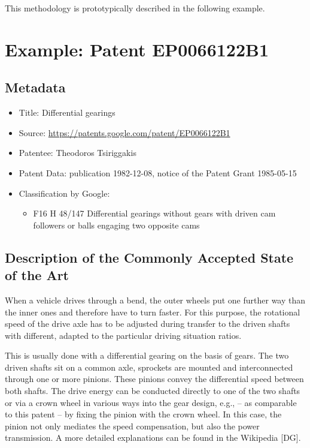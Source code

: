 \documentclass[11pt,a4paper]{article}
\begin{document}
This methodology is prototypically described in the following example.

\section{Example: Patent EP0066122B1}

\subsection{Metadata}
\begin{itemize} \itemsep0pt
\item Title: Differential gearings
\item Source: \url{https://patents.google.com/patent/EP0066122B1}
\item Patentee: Theodoros Tsiriggakis
\item Patent Data: publication 1982-12-08, notice of the Patent Grant
  1985-05-15
\item Classification by Google:
  \begin{itemize}
  \item F16 H 48/147 Differential gearings without gears with driven cam
    followers or balls engaging two opposite cams
  \end{itemize}
\end{itemize}

\subsection{Description of the Commonly Accepted State of the Art}

When a vehicle drives through a bend, the outer wheels put one further way
than the inner ones and therefore have to turn faster.  For this purpose, the
rotational speed of the drive axle has to be adjusted during transfer to the
driven shafts with different, adapted to the particular driving situation
ratios.

This is usually done with a differential gearing on the basis of gears. The
two driven shafts sit on a common axle, sprockets are mounted and
interconnected through one or more pinions. These pinions convey the
differential speed between both shafts. The drive energy can be conducted
directly to one of the two shafts or via a crown wheel in various ways into
the gear design, e.g., -- as comparable to this patent -- by fixing the pinion
with the crown wheel. In this case, the pinion not only mediates the speed
compensation, but also the power transmission. A more detailed explanations
can be found in the Wikipedia [DG].
\end{document}
